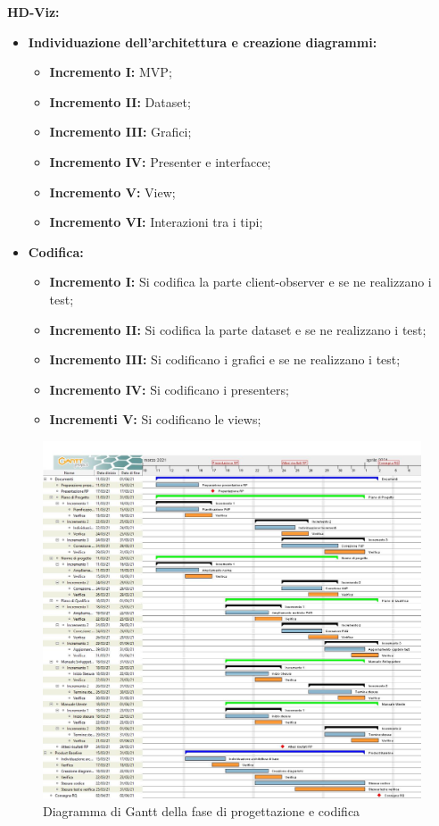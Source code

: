 \documentclass[../piano_di_progetto.tex]{subfiles}
\begin{document}
\textbf{HD-Viz:}
\begin{itemize}
    \item \textbf{Individuazione dell'architettura e creazione diagrammi:}
    \begin{itemize}
        \item \textbf{Incremento I:} MVP;
        \item \textbf{Incremento II:} Dataset;
        \item \textbf{Incremento III:} Grafici;
        \item \textbf{Incremento IV:} Presenter e interfacce;
        \item \textbf{Incremento V:} View;
        \item \textbf{Incremento VI:} Interazioni tra i tipi;      
    \end{itemize}

    \item \textbf{Codifica:}
    \begin{itemize}
        \item \textbf{Incremento I:} Si codifica la parte client-observer e se ne realizzano i test;
        \item \textbf{Incremento II:} Si codifica la parte dataset e se ne realizzano i test;
        \item \textbf{Incremento III:} Si codificano i grafici e se ne realizzano i test;
        \item \textbf{Incremento IV:} Si codificano i presenters;
        \item \textbf{Incrementi V:} Si codificano le views;
    \end{itemize}
\end{itemize}

\begin{figure}[H]
\centering
\includegraphics[width=18cm]{src/img/gantt/pianificazione_iniziale_RQ.jpg}
\caption{Diagramma di Gantt della fase di progettazione e codifica}
\end{figure}
\end{document}
